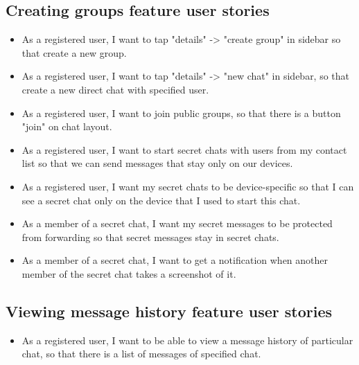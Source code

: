 \subsection{Creating groups feature user stories}\label{subsec:creating-groups-feature-user-stories}
\begin{itemize}
    \item As a registered user, I want to tap "details" -> "create group" in sidebar so that create a new group.
    \item As a registered user, I want to tap "details" -> "new chat" in sidebar, so that create a new direct chat with specified user.
    \item As a registered user, I want to join public groups, so that there is a button "join" on chat layout.
    \item As a registered user, I want to start secret chats with users from my contact list so that we can send messages that stay only on our devices.
    \item As a registered user, I want my secret chats to be device-specific so that I can see a secret chat only on the device that I used to start this chat.
    \item As a member of a secret chat, I want my secret messages to be protected from forwarding so that secret messages stay in secret chats.
    \item As a member of a secret chat, I want to get a notification when another member of the secret chat takes a screenshot of it.
\end{itemize}

\subsection{Viewing message history feature user stories}\label{subsec:viewing-message-history-feature-user-stories}
\begin{itemize}
    \item As a registered user, I want to be able to view a message history of particular chat, so that there is a list of messages of specified chat.
\end{itemize}



